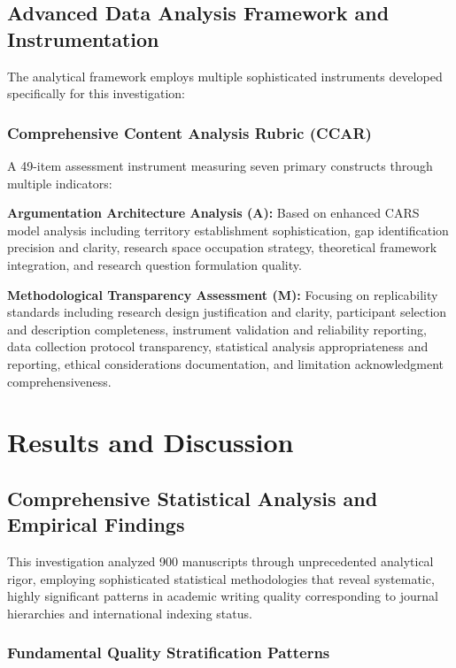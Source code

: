\documentclass[journal,article,submit,pdftex,moreauthors]{Definitions/mdpi}
\begin{document}
\subsection{Advanced Data Analysis Framework and Instrumentation}

The analytical framework employs multiple sophisticated instruments developed specifically for this investigation:

\subsubsection{Comprehensive Content Analysis Rubric (CCAR)}

A 49-item assessment instrument measuring seven primary constructs through multiple indicators:

\textbf{Argumentation Architecture Analysis (A):} Based on enhanced CARS model analysis including territory establishment sophistication, gap identification precision and clarity, research space occupation strategy, theoretical framework integration, and research question formulation quality.

\textbf{Methodological Transparency Assessment (M):} Focusing on replicability standards including research design justification and clarity, participant selection and description completeness, instrument validation and reliability reporting, data collection protocol transparency, statistical analysis appropriateness and reporting, ethical considerations documentation, and limitation acknowledgment comprehensiveness.

\section{Results and Discussion}

\subsection{Comprehensive Statistical Analysis and Empirical Findings}

This investigation analyzed 900 manuscripts through unprecedented analytical rigor, employing sophisticated statistical methodologies that reveal systematic, highly significant patterns in academic writing quality corresponding to journal hierarchies and international indexing status.

\subsubsection{Fundamental Quality Stratification Patterns}
\end{document}
